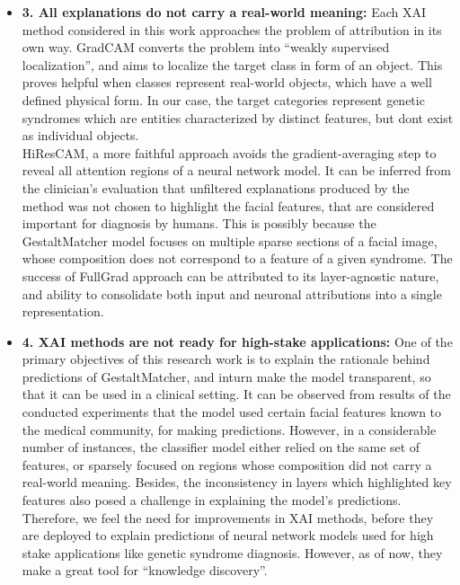 \documentclass[../report.tex]{subfiles}
\begin{document}
\begin{itemize}
    	\item{\textbf{3. All explanations do not carry a real-world meaning:}} Each XAI method considered in this work approaches the problem of attribution in its own way. GradCAM converts the problem into \enquote{weakly supervised localization}, and aims to localize the target class in form of an object. This proves helpful when classes represent real-world objects, which have a well defined physical form. In our case, the target categories represent genetic syndromes which are entities characterized by distinct features, but dont exist as individual objects.\\ 
    	HiResCAM, a more faithful approach avoids the gradient-averaging step to reveal all attention regions of a neural network model. It can be inferred from the clinician's evaluation that unfiltered explanations produced by the method was not chosen to highlight the facial features, that are considered important for diagnosis by humans. This is possibly because the GestaltMatcher model focuses on multiple sparse sections of a facial image, whose composition does not correspond to a feature of a given syndrome. The success of FullGrad approach can be attributed to its layer-agnostic nature, and ability to consolidate both input and neuronal attributions into a single representation.
    	
    	\item{\textbf{4. XAI methods are not ready for high-stake applications:}}  One of the primary objectives of this research work is to explain the rationale behind predictions of GestaltMatcher, and inturn make the model transparent, so that it can be used in a clinical setting. It can be observed from results of the conducted experiments that the model used certain facial features known to the medical community, for making predictions. However, in a considerable number of instances, the classifier model either relied on the same set of features, or sparsely focused on regions whose composition did not carry a real-world meaning. Besides, the inconsistency in layers which highlighted key features also posed a challenge in explaining the model's predictions. Therefore, we feel the need for improvements in XAI methods, before they are deployed to explain predictions of neural network models used for high stake applications like genetic syndrome diagnosis. However, as of now, they make a great tool for \enquote{knowledge discovery}.
    \end{itemize} 
\end{document}
